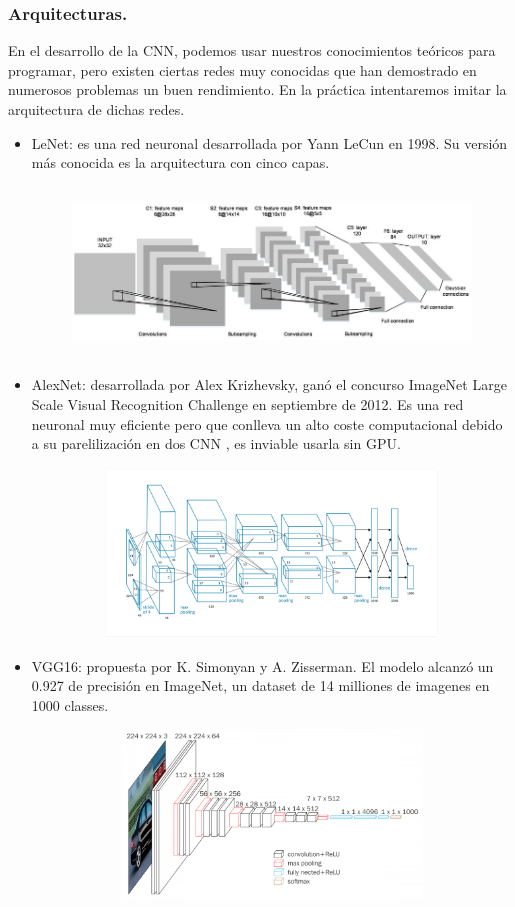 \documentclass[a4paper,10pt]{article}
\begin{document}
\subsubsection{Arquitecturas.}
En el desarrollo de la CNN, podemos usar nuestros conocimientos teóricos para programar, pero existen ciertas redes muy conocidas que han demostrado en numerosos problemas un buen rendimiento. En la práctica intentaremos imitar la arquitectura de dichas redes.
\begin{itemize}
\item LeNet: es una red neuronal desarrollada por Yann LeCun en 1998. Su versión más conocida es la arquitectura con cinco capas. \begin{figure}[H]
\centering
\includegraphics[width=14.0cm, height=4.5cm]{lenet5.png}
\end{figure}
\item AlexNet: desarrollada por Alex Krizhevsky, ganó el concurso ImageNet Large Scale Visual Recognition Challenge en septiembre de 2012. Es una red neuronal muy eficiente pero que conlleva un alto coste computacional debido a su parelilización en dos CNN , es inviable usarla sin GPU.\begin{figure}[H]
\centering
\includegraphics[width=14.0cm, height=4.5cm]{AlexNet2012.png}
\end{figure}
\item VGG16: propuesta por K. Simonyan y A. Zisserman. El modelo alcanzó un 0.927 de precisión en ImageNet, un dataset de 14 milliones de imagenes en 1000 classes. \begin{figure}[H]
\centering
\includegraphics[width=12.0cm, height=4.5cm]{vgg16-1-e1542731207177.png}

\end{figure}
\end{itemize}
\end{document}
